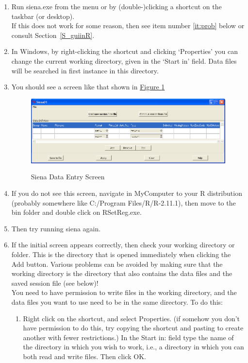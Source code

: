 \documentclass[a4paper,fleqn]{article}
\newcommand{\+}{\, + \,}
\newcommand{\sfn}[1]{\textsf{#1}}
\newcommand{\Rn}{{\sf R}}
\begin{document}
\begin{enumerate}
\item Run \sfn{siena.exe} from the menu or by (double-)clicking a shortcut on
  the taskbar (or desktop).\\
  If this does not work for some reason, then see item number \ref{it:prob}
  below or consult Section~\ref{S_guiinR}.
\item In Windows, by right-clicking the shortcut and clicking `Properties'
      you can change the current working directory, given in the
      `Start in' field. Data files will be searched in first instance
      in this directory.
\item You should see a screen like that shown in \hyperlink{siena1}{Figure
    \ref{fig:siena1}}
  \begin{figure}[ht]
    \begin{center}
      \includegraphics[width=\textwidth]{siena1.png}
\hypertarget{siena1}{}
    \end{center}
\caption{Siena Data Entry Screen}
\label{fig:siena1}
  \end{figure}
\item \label{it:prob} If you do not see this screen, navigate in MyComputer to your \Rn{}
  distribution (probably somewhere like \textsf{C:/Program Files/R/R-2.11.1}),
  then move to the \textsf{bin} folder and double click on \textsf{RSetReg.exe}.
\item Then try running siena again.
\item If the initial screen appears correctly, then check your working directory
  or folder. This is
  the directory that is opened immediately when clicking the \textsf{Add} button.
  Various problems can be avoided by making sure that the working directory
  is the directory that also contains the data files and the saved session file
  (see below)!\\
  You need to have permission to write files in the working directory,
  and the data files you want to use need to be in the same directory. To
  do this:
\begin{enumerate}
\item Right click on the shortcut, and select Properties. (if somehow you
don't have permission to do this, try copying the shortcut and pasting
to create another with fewer restrictions.)  In the \textsf{Start in:} field
type the name of the directory in which you wish to work, i.e., a
directory in which you can both read and write files. Then click OK.


\end{enumerate}
\end{enumerate}
\end{document}
